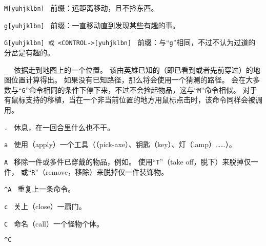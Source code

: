 \documentclass[a4paper, 10pt]{article}
\newcommand{\tb}[1]{\tt #1 \hfill}
\begin{document}
\item[\tb{M[yuhjklbn]}]
前缀：远距离移动，且不捡东西。
\item[\tb{g[yuhjklbn]}]
前缀：一直移动直到发现某些有趣的事。
\item[\tb{G[yuhjklbn] {\rm 或} <CONTROL->[yuhjklbn]}]
前缀：与“{\tt g}”相同，不过不认为过道的分岔是有趣的。
\item[\tb{_}]
依据\zhTransShortestPathAlg{}走到地图上的一个位置。
该\zhTransShortestPath{}由英雄已知的（即已看到或者先前穿过）的地图位置计算得出。
如果没有已知路径，那么将会使用一个猜测的路径。
会在大多数与“{\tt G}”命令相同的条件下停下来，不过不会捡起物品，这与“{\tt M}”命令相似。
对于有鼠标支持的移植，当在一个非当前位置的地方用鼠标点击时，该命令同样会被调用。
\item[\tb{.}]
休息，在一回合里什么也不干。
\item[\tb{a}]
使用（apply）一个工具（\zhTransPickAxe（pick-axe）、钥匙（key）、灯（lamp）……）。
\item[\tb{A}]
移除一件或多件已穿戴的物品，例如\zhTransArmor{}。
使用“{\tt T}”（take off，脱下）来脱掉仅一件\zhTransArmor{}，
或“{\tt R}”（remove，移除）来脱掉仅一件装饰物。
\item[\tb{\^{}A}]
重复上一条命令。
\item[\tb{c}]
关上（close）一扇门。
\item[\tb{C}]
命名（call）一个怪物个体。
\item[\tb{\^{}C}]
\end{document}
